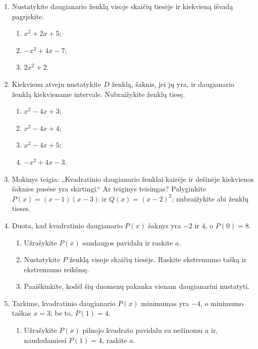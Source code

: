 \documentclass[12pt,a4paper]{article}
\begin{document}
\begin{enumerate}[series=uzdaviniai]
\begin{enumerate}
\item Tarkime, $a>0$. Nustatykite $-\frac{D}{4a}$ ženklą ir įrodykite, kad $P(x)>0$ kiekvienam realiajam $x$.
\item Tą patį padarykite, kai $a<0$. Palyginkite daugianario ženklą su $a$ ženklu.
\end{enumerate}
\par\medskip
\textbf{Sustok ir apibendrink.} Kodėl, kai $D<0$, daugianario ženklas visur sutampa su $a$ ženklu?
\item Nustatykite daugianario ženklą visoje skaičių tiesėje ir kiekvieną išvadą pagrįskite.
\begin{enumerate}
\item $x^2+2x+5$; \item $-x^2+4x-7$; \item $2x^2+2$.
\end{enumerate}
\item Kiekvienu atveju nustatykite $D$ ženklą, šaknis, jei jų yra, ir daugianario ženklą kiekviename intervale. Nubraižykite ženklų tiesę.
\begin{enumerate}
\item $x^2-4x+3$; \item $x^2-4x+4$; \item $x^2-4x+5$; \item $-x^2+4x-3$.
\end{enumerate}
\item Mokinys teigia: „Kvadratinio daugianario ženklai kairėje ir dešinėje kiekvienos šaknies pusėse yra skirtingi.“ Ar teiginys teisingas? Palyginkite $P(x)=(x-1)(x-3)$ ir $Q(x)=(x-2)^2$; nubraižykite abi ženklų tieses.
\item Duota, kad kvadratinio daugianario $P(x)$ šaknys yra $-2$ ir $4$, o $P(0)=8$.
\begin{enumerate}
\item Užrašykite $P(x)$ sandaugos pavidalu ir raskite $a$.
\item Nustatykite $P$ ženklą visoje skaičių tiesėje. Raskite ekstremumo tašką ir ekstremumo reikšmę.
\item Paaiškinkite, kodėl šių duomenų pakanka vienam daugianariui nustatyti.
\end{enumerate}
\item Tarkime, kvadratinio daugianario $P(x)$ minimumas yra $-4$, o minimumo taškas $x=3$; be to, $P(1)=4$.
\begin{enumerate}
\item Užrašykite $P(x)$ pilnojo kvadrato pavidalu su nežinomu $a$ ir, naudodamiesi $P(1)=4$, raskite $a$.

\end{enumerate}
\end{enumerate}
\end{document}
